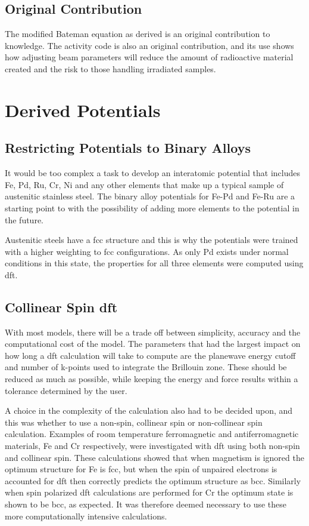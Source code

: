 \subsection{Original Contribution}

The modified Bateman equation as derived is an original contribution to knowledge.  The activity code is also an original contribution, and its use shows how adjusting beam parameters will reduce the amount of radioactive material created and the risk to those handling irradiated samples.



\section{Derived Potentials}

\subsection{Restricting Potentials to Binary Alloys}

It would be too complex a task to develop an interatomic potential that includes Fe, Pd, Ru, Cr, Ni and any other elements that make up a typical sample of austenitic stainless steel.  The binary alloy potentials for Fe-Pd and Fe-Ru are a starting point to with the possibility of adding more elements to the potential in the future.

Austenitic steels have a \acrshort{fcc} structure and this is why the potentials were trained with a higher weighting to \acrshort{fcc} configurations.  As only Pd exists under normal conditions in this state, the properties for all three elements were computed using \acrshort{dft}.


\subsection{Collinear Spin \acrshort{dft}}

With most models, there will be a trade off between simplicity, accuracy and the computational cost of the model.  The parameters that had the largest impact on how long a \acrshort{dft} calculation will take to compute are the planewave energy cutoff and number of k-points used to integrate the Brillouin zone.  These should be reduced as much as possible, while keeping the energy and force results within a tolerance determined by the user.

A choice in the complexity of the calculation also had to be decided upon, and this was whether to use a non-spin, collinear spin or non-collinear spin calculation.  Examples of room temperature ferromagnetic and antiferromagnetic materials, Fe and Cr respectively, were investigated with \acrshort{dft} using both non-spin and collinear spin.  These calculations showed that when magnetism is ignored the optimum structure for Fe is \acrshort{fcc}, but when the spin of unpaired electrons is accounted for \acrshort{dft} then correctly predicts the optimum structure as \acrshort{bcc}.  Similarly when spin polarized \acrshort{dft} calculations are performed for Cr the optimum state is shown to be \acrshort{bcc}, as expected.  It was therefore deemed necessary to use these more computationally intensive calculations.

